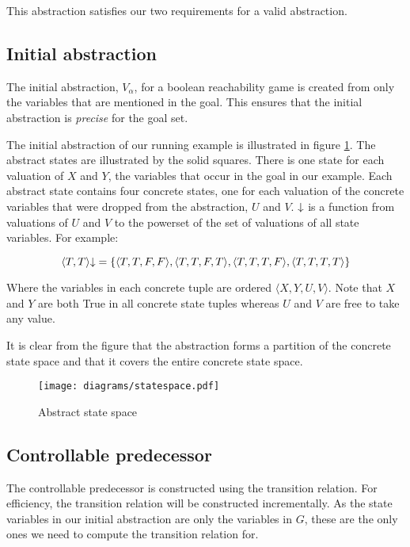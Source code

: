 This abstraction satisfies our two requirements for a valid abstraction. 

\subsection{Initial abstraction}

The initial abstraction, $V_{\alpha}$, for a boolean reachability game is created from only the variables that are mentioned in the goal. This ensures that the initial abstraction is \emph{precise} for the goal set.

The initial abstraction of our running example is illustrated in figure \ref{fig:abs_state_sp}. The abstract states are illustrated by the solid squares. There is one state for each valuation of $X$ and $Y$, the variables that occur in the goal in our example. Each abstract state contains four concrete states, one for each valuation of the concrete variables that were dropped from the abstraction, $U$ and $V$. $\mathord{\downarrow}$ is a function from valuations of $U$ and $V$ to the powerset of the set of valuations of all state variables. For example:

\begin{equation}
    \langle T, T \rangle\mathord{\downarrow} = \{ \langle T, T, F, F \rangle, \langle T, T, F, T \rangle, \langle T, T, T, F \rangle, \langle T, T, T, T \rangle \}
\end{equation}

Where the variables in each concrete tuple are ordered $\langle X, Y, U, V \rangle$. Note that $X$ and $Y$ are both True in all concrete state tuples whereas $U$ and $V$ are free to take any value.

It is clear from the figure that the abstraction forms a partition of the concrete state space and that it covers the entire concrete state space.

\begin{figure}[t]
\centering
\texttt{[image: diagrams/statespace.pdf]}
\caption{Abstract state space}
\label{fig:abs_state_sp}
\end{figure}

\subsection{Controllable predecessor}

The controllable predecessor is constructed using the transition relation. For efficiency, the transition relation will be constructed incrementally. As the state variables in our initial abstraction are only the variables in $G$, these are the only ones we need to compute the transition relation for.


